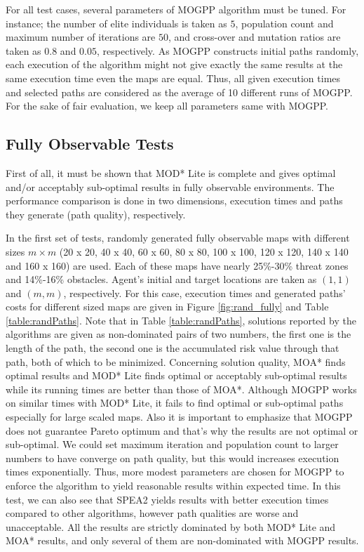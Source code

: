 \documentclass[10pt,journal]{IEEEtran}
\begin{document}
For all test cases, several parameters of MOGPP algorithm must be tuned. For instance; the number of elite individuals is taken as $5$, population count and maximum number of iterations are $50$, and cross-over and mutation ratios are taken as $0.8$ and $0.05$, respectively. As MOGPP constructs initial paths randomly, each execution of the algorithm might not give exactly the same results at the same execution time even the maps are equal. Thus, all given execution times and selected paths are considered as the average of 10 different runs of MOGPP. For the sake of fair evaluation, we keep all parameters same with MOGPP.  

\subsection{Fully Observable Tests}

First of all, it must be shown that MOD* Lite is complete and gives optimal and/or acceptably sub-optimal results in fully observable environments. The performance comparison is done in two dimensions, execution times and paths they generate (path quality), respectively.

In the first set of tests, randomly generated fully observable maps with different sizes $m \times m$ (20 x 20, 40 x 40, 60 x 60, 80 x 80, 100 x 100, 120 x 120, 140 x 140 and 160 x 160) are used. Each of these maps have nearly 25\%-30\%  threat zones and 14\%-16\%  obstacles. Agent's initial and target locations are taken as $(1, 1)$ and $(m, m)$, respectively. For this case, execution times and generated paths' costs for different sized maps are given in Figure \ref{fig:rand_fully} and Table \ref{table:randPaths}. Note that in Table \ref{table:randPaths}, solutions reported by the algorithms are given as non-dominated pairs of two numbers, the first one is the length of the path, the second one is the accumulated risk value through that path, both of which to be minimized. Concerning solution quality, MOA* finds optimal results and MOD* Lite finds optimal or acceptably sub-optimal results while its running times are better than those of MOA*. Although MOGPP works on similar times with MOD* Lite, it fails to find optimal or sub-optimal paths especially for large scaled maps. Also it is important to emphasize that MOGPP does not guarantee Pareto optimum and that's why the results are not optimal or sub-optimal. We could set maximum iteration and population count to larger numbers to have converge on path quality, but this would increases execution times exponentially. Thus, more modest parameters are chosen for MOGPP to enforce the algorithm to yield reasonable results within expected time. In this test, we can also see that SPEA2 yields results with better execution times compared to other algorithms, however path qualities are worse and unacceptable. All the results are strictly dominated by both MOD* Lite and MOA* results, and only several of them are non-dominated with MOGPP results. 
 
\end{document}
